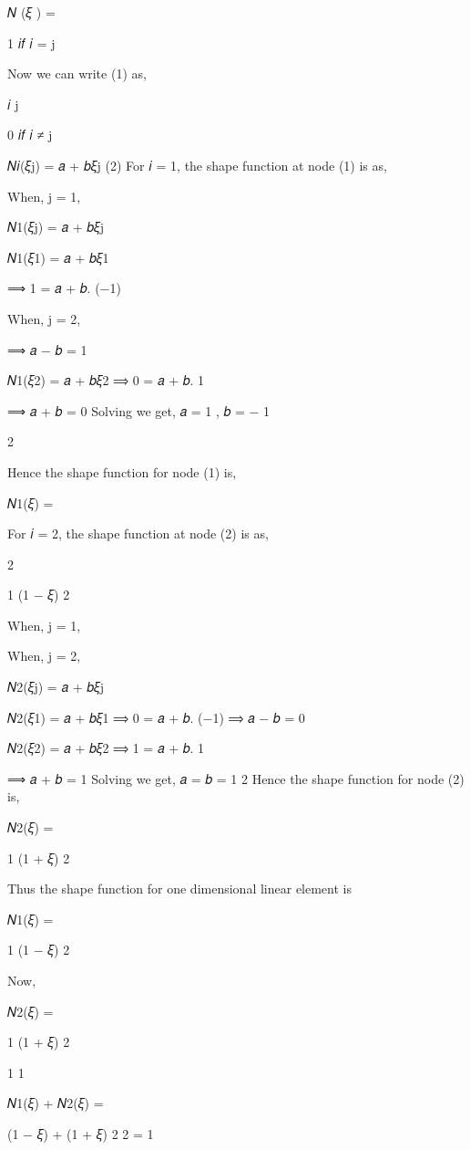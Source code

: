 {{𝑁 (𝜉 ) = {1	𝑖𝑓	𝑖 = j
 

Now we can write (1) as,
 
𝑖	j
 
0	𝑖𝑓 𝑖 ≠ j
 
𝑁𝑖(𝜉j) = 𝑎 + 𝑏𝜉j	(2)
For 𝑖 = 1, the shape function at node (1) is as,

 


When, j = 1,
 
𝑁1(𝜉j) = 𝑎 + 𝑏𝜉j


𝑁1(𝜉1) = 𝑎 + 𝑏𝜉1
 
⟹ 1 = 𝑎 + 𝑏. (−1)

 


When, j = 2,
 
⟹ 𝑎 − 𝑏 = 1

𝑁1(𝜉2) = 𝑎 + 𝑏𝜉2
⟹ 0 = 𝑎 + 𝑏. 1
 
⟹ 𝑎 + 𝑏 = 0
Solving we get,	𝑎 = 1 ,  𝑏 = − 1
 
2

Hence the shape function for node (1) is,

𝑁1(𝜉) =

For 𝑖 = 2, the shape function at node (2) is as,
 
2



1
  (1 − 𝜉)
2
 

 


When, j = 1,





When, j = 2,
 
𝑁2(𝜉j) = 𝑎 + 𝑏𝜉j


𝑁2(𝜉1) = 𝑎 + 𝑏𝜉1
⟹ 0 = 𝑎 + 𝑏. (−1)
⟹ 𝑎 − 𝑏 = 0

𝑁2(𝜉2) = 𝑎 + 𝑏𝜉2
⟹ 1 = 𝑎 + 𝑏. 1
 
⟹ 𝑎 + 𝑏 = 1
Solving we get,	𝑎 = 𝑏 = 1
2
Hence the shape function for node (2) is,

 
𝑁2(𝜉) =
 
1
  (1 + 𝜉)
2
 
Thus the shape function for one dimensional linear element is

 
𝑁1(𝜉) =
 
1
  (1 − 𝜉)
2
 



Now,
 
𝑁2(𝜉) =
 
1
  (1 + 𝜉)
2

1	1
 
𝑁1(𝜉) + 𝑁2(𝜉)  =
 
  (1 − 𝜉) +   (1 + 𝜉)
2	2
= 1
 

}}}
